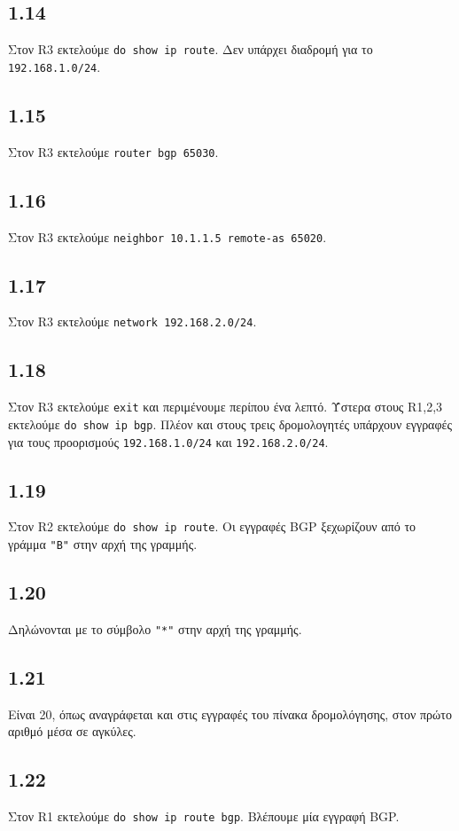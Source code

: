 \documentclass[a4paper, 12pt]{article}
\begin{document}
	\subsection*{1.14}
		Στον R3 εκτελούμε \verb|do show ip route|. Δεν υπάρχει διαδρομή για το \verb|192.168.1.0/24|.

	\subsection*{1.15}
		Στον R3 εκτελούμε \verb|router bgp 65030|. 

	\subsection*{1.16}
		Στον R3 εκτελούμε \verb|neighbor 10.1.1.5 remote-as 65020|.

	\subsection*{1.17}
		Στον R3 εκτελούμε \verb|network 192.168.2.0/24|.

	\subsection*{1.18}
		Στον R3 εκτελούμε \verb|exit| και περιμένουμε περίπου ένα λεπτό. Ύστερα στους R1,2,3 εκτελούμε \verb|do show ip bgp|. Πλέον και στους τρεις δρομολογητές υπάρχουν εγγραφές για τους προορισμούς \verb|192.168.1.0/24| και \verb|192.168.2.0/24|. 

	\subsection*{1.19}
		Στον R2 εκτελούμε \verb|do show ip route|. Οι εγγραφές BGP ξεχωρίζουν από το γράμμα \verb|"B"| στην αρχή της γραμμής.

	\subsection*{1.20}
		Δηλώνονται με το σύμβολο \verb|"*"| στην αρχή της γραμμής.

	\subsection*{1.21}
		Είναι 20, όπως αναγράφεται και στις εγγραφές του πίνακα δρομολόγησης, στον πρώτο αριθμό μέσα σε αγκύλες. 

	\subsection*{1.22}
		Στον R1 εκτελούμε \verb|do show ip route bgp|. Βλέπουμε μία εγγραφή BGP.
\end{document}
